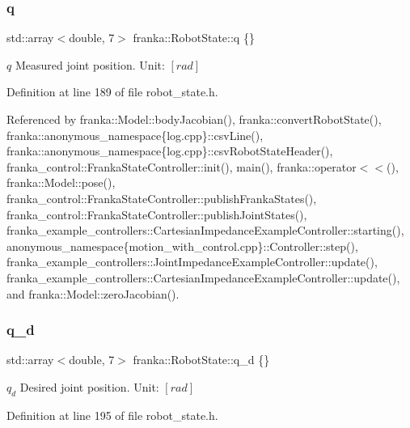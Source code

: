 \mbox{\label{structfranka_1_1RobotState_ade3335d1ac2f6c44741a916d565f7091}} 
\subsubsection{\texorpdfstring{q}{q}}
{\footnotesize\ttfamily std\+::array$<$double, 7$>$ franka\+::\+Robot\+State\+::q \{\}}

$q$ Measured joint position. Unit\+: $[rad]$ 

Definition at line 189 of file robot\+\_\+state.\+h.



Referenced by franka\+::\+Model\+::body\+Jacobian(), franka\+::convert\+Robot\+State(), franka\+::anonymous\+\_\+namespace\{log.\+cpp\}\+::csv\+Line(), franka\+::anonymous\+\_\+namespace\{log.\+cpp\}\+::csv\+Robot\+State\+Header(), franka\+\_\+control\+::\+Franka\+State\+Controller\+::init(), main(), franka\+::operator$<$$<$(), franka\+::\+Model\+::pose(), franka\+\_\+control\+::\+Franka\+State\+Controller\+::publish\+Franka\+States(), franka\+\_\+control\+::\+Franka\+State\+Controller\+::publish\+Joint\+States(), franka\+\_\+example\+\_\+controllers\+::\+Cartesian\+Impedance\+Example\+Controller\+::starting(), anonymous\+\_\+namespace\{motion\+\_\+with\+\_\+control.\+cpp\}\+::\+Controller\+::step(), franka\+\_\+example\+\_\+controllers\+::\+Joint\+Impedance\+Example\+Controller\+::update(), franka\+\_\+example\+\_\+controllers\+::\+Cartesian\+Impedance\+Example\+Controller\+::update(), and franka\+::\+Model\+::zero\+Jacobian().

\mbox{\label{structfranka_1_1RobotState_a706045af1b176049e9e56df755325bd2}} 
\subsubsection{\texorpdfstring{q\+\_\+d}{q\_d}}
{\footnotesize\ttfamily std\+::array$<$double, 7$>$ franka\+::\+Robot\+State\+::q\+\_\+d \{\}}

$q_d$ Desired joint position. Unit\+: $[rad]$ 

Definition at line 195 of file robot\+\_\+state.\+h.



